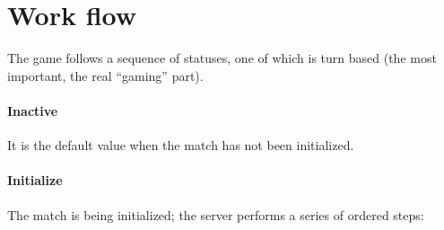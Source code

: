 	\section{Work flow}
	\label{workflow:general}
		
		The game follows a sequence of statuses, one of which is turn based (the most important, the real “gaming” part).
	
		\paragraph{Inactive}
		
			It is the default value when the match has not been initialized.
	
		\paragraph{Initialize}
		
			The match is being initialized; the server performs a series of ordered steps:
			
